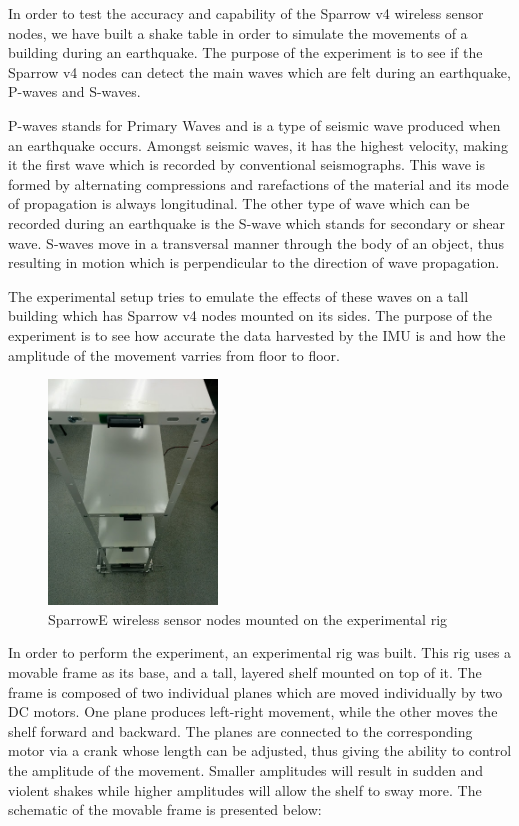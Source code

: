 In order to test the accuracy and capability of the Sparrow v4 wireless sensor nodes, we 
have built a shake table in order to simulate the movements of a building during an earthquake.
The purpose of the experiment is to see if the Sparrow v4 nodes can detect the main waves which 
are felt during an earthquake, P-waves and S-waves.

P-waves stands for Primary Waves and is a type of seismic wave produced when an earthquake occurs.
Amongst seismic waves, it has the highest velocity, making it the first wave which is recorded by 
conventional seismographs. This wave is formed by alternating compressions and rarefactions of the 
material and its mode of propagation is always longitudinal. The other type of wave which can be 
recorded during an earthquake is the S-wave which stands for secondary or shear wave. S-waves move 
in a transversal manner through the body of an object, thus resulting in motion which is perpendicular 
to the direction of wave propagation. 

The experimental setup tries to emulate the effects of these waves on a tall building which has Sparrow v4 
nodes mounted on its sides. The purpose of the experiment is to see how accurate the data harvested by the 
IMU is and how the amplitude of the movement varries from floor to floor.

\begin{figure}[ht] \centering
  \includegraphics[width=0.4\textwidth]{img/mounted-sparrow-nodes.jpg}
  \caption{SparrowE wireless sensor nodes mounted on the experimental rig}
\end{figure}

In order to perform the experiment, an experimental rig was built. This rig uses a movable frame as its base, 
and a tall, layered shelf mounted on top of it. The frame is composed of two individual planes which are moved 
individually by two DC motors. One plane produces left-right movement, while the other moves the shelf forward and 
backward. The planes are connected to the corresponding motor via a crank whose length can be adjusted, thus giving the 
ability to control the amplitude of the movement. Smaller amplitudes will result in sudden and violent shakes while 
higher amplitudes will allow the shelf to sway more. The schematic of the movable frame is presented below:

